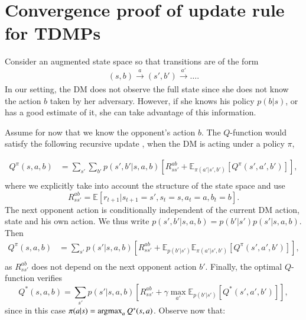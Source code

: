 
\section{Convergence proof of update rule for TDMPs}\label{sec:p}

Consider an augmented state space so that transitions are of the form
$$
 (s,b) \xrightarrow[]{a} (s',b') \xrightarrow[]{a'} \ldots.
$$
In our setting, the DM does not observe the full state since she does
not know the action $b$ taken by her adversary. However, if she knows his policy $p(b|s)$, or has a good estimate of it, she can take advantage of this information.

Assume for now that we know the opponent's action $b$. The $Q$-function would satisfy the following recursive update \parencite{sutton2012reinforcement}, when the DM is acting under a policy $\pi$,

\begin{eqnarray*}
Q^\pi (s,a,b) &=  \sum_{s'} \sum_{b'} p(s', b' |s,a,b) \left[ R_{ss'}^{ab} +  \mathbb{E}_{\pi(a'|s',b')} \left[ Q^\pi(s',a',b') \right] \right],\\
\end{eqnarray*}
where we explicitly take into account the structure of the state space and 
use 
$$
R_{ss'}^{ab} = \mathbb{E}\left[ r_{t+1}|s_{t+1} = s', s_{t} = s, a_t = a, b_t = b \right].
$$ 
The next opponent action is conditionally independent of the 
current DM action, state and his own action. We thus write $p(s', b' |s,a,b) = p(b'|s')p(s'|s,a,b)$. Then
\begin{eqnarray*}
Q^\pi (s,a,b) &=  \sum_{s'} p(s'|s,a,b) \left[ R_{ss'}^{ab} +  \mathbb{E}_{p(b'|s')} \mathbb{E}_{\pi(a'|s',b')} \left[ Q^\pi(s',a',b') \right] \right],\\
\end{eqnarray*}
as $R_{ss'}^{ab}$ does not depend on the next opponent action $b'$. Finally, the optimal $Q$-function verifies
$$
Q^*(s,a,b) =  \sum_{s'} p(s'|s,a,b) \left[ R_{ss'}^{ab} + \gamma \max_{a'} \mathbb{E}_{p(b'|s')} \left[ Q^*(s',a',b') \right] \right],
$$
since in this case $\pi(a|s) = \operatorname*{argmax}_a Q^*(s,a)$. Observe now that:

